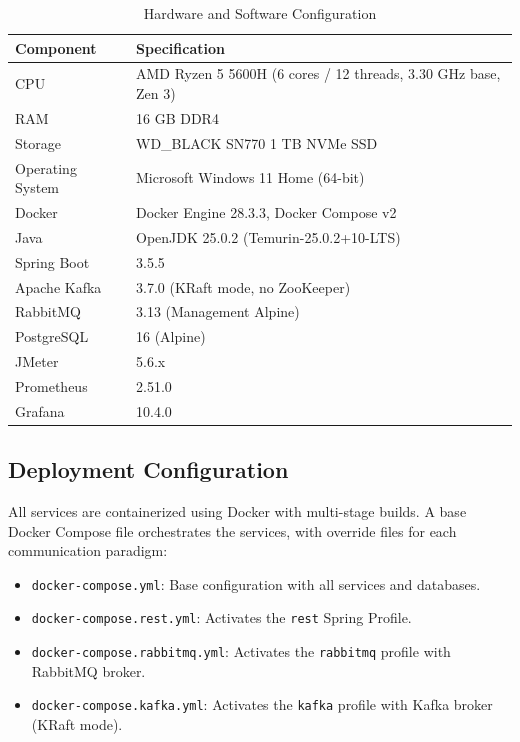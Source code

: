 \documentclass[journal]{IEEEtran}
\begin{document}
\begin{table}[!t]
\caption{Hardware and Software Configuration}
\label{tab:hardware}
\centering
\scriptsize
\begin{tabularx}{\columnwidth}{lX}
\toprule
\textbf{Component} & \textbf{Specification} \\
\midrule
CPU & AMD Ryzen 5 5600H (6 cores / 12 threads, 3.30 GHz base, Zen 3) \\
RAM & 16 GB DDR4 \\
Storage & WD\_BLACK SN770 1 TB NVMe SSD \\
Operating System & Microsoft Windows 11 Home (64-bit) \\
Docker & Docker Engine 28.3.3, Docker Compose v2 \\
Java & OpenJDK 25.0.2 (Temurin-25.0.2+10-LTS) \\
Spring Boot & 3.5.5 \\
Apache Kafka & 3.7.0 (KRaft mode, no ZooKeeper) \\
RabbitMQ & 3.13 (Management Alpine) \\
PostgreSQL & 16 (Alpine) \\
JMeter & 5.6.x \\
Prometheus & 2.51.0 \\
Grafana & 10.4.0 \\
\bottomrule
\end{tabularx}
\end{table}

\subsection{Deployment Configuration}
\label{subsec:deployment}

All services are containerized using Docker with multi-stage builds. A base Docker Compose file orchestrates the services, with override files for each communication paradigm:

\begin{itemize}
    \item \texttt{docker-compose.yml}: Base configuration with all services and databases.
    \item \texttt{docker-compose.rest.yml}: Activates the \texttt{rest} Spring Profile.
    \item \texttt{docker-compose.rabbitmq.yml}: Activates the \texttt{rabbitmq} profile with RabbitMQ broker.
    \item \texttt{docker-compose.kafka.yml}: Activates the \texttt{kafka} profile with Kafka broker (KRaft mode).
\end{itemize}
\end{document}

